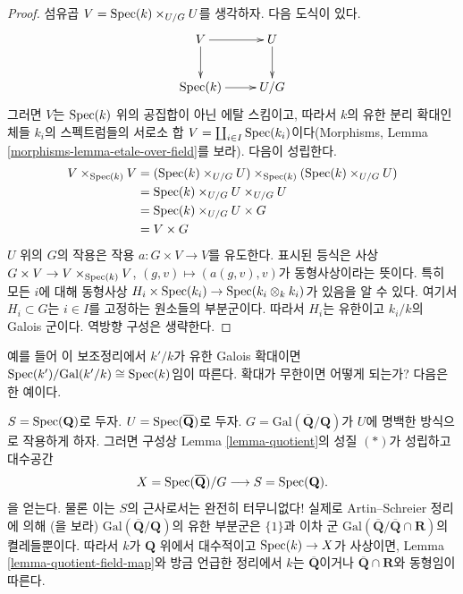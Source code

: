 \begin{proof}
섬유곱 $V = \mathop{\mathrm{Spec}}(k) \times_{U/G} U$를 생각하자. 다음 도식이 있다.
$$
\xymatrix{
V \ar[r] \ar[d] & U \ar[d] \\
\Spec(k) \ar[r] & U/G
}
$$
그러면 $V$는 $\mathop{\mathrm{Spec}}(k)$ 위의 공집합이 아닌 에탈 스킴이고, 따라서
$k$의 유한 분리 확대인 체들 $k_i$의 스펙트럼들의 서로소 합
$V = \coprod_{i \in I} \mathop{\mathrm{Spec}}(k_i)$이다(Morphisms, Lemma
\ref{morphisms-lemma-etale-over-field}를 보라). 다음이 성립한다.
\begin{align*}
V \times_{\mathop{\mathrm{Spec}}(k)} V
& =
(\mathop{\mathrm{Spec}}(k) \times_{U/G} U) \times_{\mathop{\mathrm{Spec}}(k)}(\mathop{\mathrm{Spec}}(k) \times_{U/G} U) \\
& =
\mathop{\mathrm{Spec}}(k) \times_{U/G} U \times_{U/G} U \\
& =
\mathop{\mathrm{Spec}}(k) \times_{U/G} U \times G \\
& =
V \times G
\end{align*}
$U$ 위의 $G$의 작용은 작용 $a : G \times V \to V$를 유도한다.
표시된 등식은 사상
$G \times V \to V \times_{\mathop{\mathrm{Spec}}(k)} V$, $(g, v) \mapsto (a(g, v), v)$가
동형사상이라는 뜻이다. 특히 모든 $i$에 대해 동형사상
$H_i \times \mathop{\mathrm{Spec}}(k_i) \to \mathop{\mathrm{Spec}}(k_i \otimes_k k_i)$가 있음을 알 수
있다. 여기서 $H_i \subset G$는 $i \in I$를 고정하는 원소들의
부분군이다. 따라서 $H_i$는 유한이고 $k_i/k$의 Galois 군이다.
역방향 구성은 생략한다.
\end{proof}

\noindent
예를 들어 이 보조정리에서 $k'/k$가 유한 Galois 확대이면
$\mathop{\mathrm{Spec}}(k')/\text{Gal}(k'/k) \cong \mathop{\mathrm{Spec}}(k)$임이 따른다.
확대가 무한이면 어떻게 되는가? 다음은 한 예이다.

\begin{example}
\label{example-Qbar}
$S = \mathop{\mathrm{Spec}}(\mathbf{Q})$로 두자.
$U = \mathop{\mathrm{Spec}}(\overline{\mathbf{Q}})$로 두자.
$G = \text{Gal}(\overline{\mathbf{Q}}/\mathbf{Q})$가 $U$에 명백한
방식으로 작용하게 하자. 그러면 구성상 Lemma \ref{lemma-quotient}의
성질 $(*)$가 성립하고 대수공간
$$
X = \mathop{\mathrm{Spec}}(\overline{\mathbf{Q}})/G
\longrightarrow
S = \mathop{\mathrm{Spec}}(\mathbf{Q}).
$$
을 얻는다. 물론 이는 $S$의 근사로서는 완전히 터무니없다!
실제로 Artin--Schreier 정리에 의해
(\cite[Theorem 17, page 316]{JacobsonIII}을 보라)
$\text{Gal}(\overline{\mathbf{Q}}/\mathbf{Q})$의 유한 부분군은
$\{1\}$과 이차 군
$\text{Gal}(\overline{\mathbf{Q}}/\overline{\mathbf{Q}} \cap \mathbf{R})$의
켤레들뿐이다. 따라서 $k$가 $\mathbf{Q}$ 위에서 대수적이고
$\mathop{\mathrm{Spec}}(k) \to X$가 사상이면, Lemma
\ref{lemma-quotient-field-map}와 방금 언급한 정리에서 $k$는
$\overline{\mathbf{Q}}$이거나
$\overline{\mathbf{Q}} \cap \mathbf{R}$와 동형임이 따른다.
\end{example}

